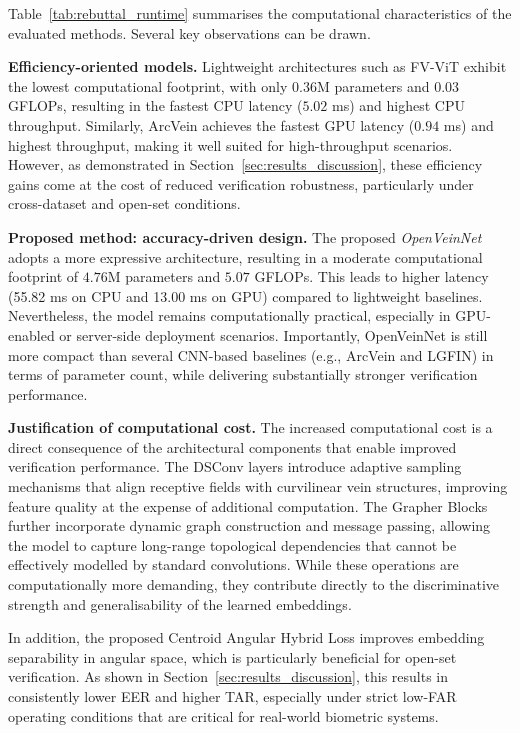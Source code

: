 \documentclass[10pt,journal,compsoc]{IEEEtran}
\begin{document}
Table~\ref{tab:rebuttal_runtime} summarises the computational characteristics of the evaluated methods. Several key observations can be drawn.

\textbf{Efficiency-oriented models.}
Lightweight architectures such as FV-ViT exhibit the lowest computational footprint, with only $0.36$M parameters and $0.03$ GFLOPs, resulting in the fastest CPU latency ($5.02$ ms) and highest CPU throughput. Similarly, ArcVein achieves the fastest GPU latency ($0.94$ ms) and highest throughput, making it well suited for high-throughput scenarios. However, as demonstrated in Section~\ref{sec:results_discussion}, these efficiency gains come at the cost of reduced verification robustness, particularly under cross-dataset and open-set conditions.

\textbf{Proposed method: accuracy-driven design.}
The proposed \textit{OpenVeinNet} adopts a more expressive architecture, resulting in a moderate computational footprint of $4.76$M parameters and $5.07$ GFLOPs. This leads to higher latency (55.82 ms on CPU and 13.00 ms on GPU) compared to lightweight baselines. Nevertheless, the model remains computationally practical, especially in GPU-enabled or server-side deployment scenarios. Importantly, OpenVeinNet is still more compact than several CNN-based baselines (e.g., ArcVein and LGFIN) in terms of parameter count, while delivering substantially stronger verification performance.

\textbf{Justification of computational cost.}
The increased computational cost is a direct consequence of the architectural components that enable improved verification performance. The DSConv layers introduce adaptive sampling mechanisms that align receptive fields with curvilinear vein structures, improving feature quality at the expense of additional computation. The Grapher Blocks further incorporate dynamic graph construction and message passing, allowing the model to capture long-range topological dependencies that cannot be effectively modelled by standard convolutions. While these operations are computationally more demanding, they contribute directly to the discriminative strength and generalisability of the learned embeddings.

In addition, the proposed Centroid Angular Hybrid Loss improves embedding separability in angular space, which is particularly beneficial for open-set verification. As shown in Section~\ref{sec:results_discussion}, this results in consistently lower EER and higher TAR, especially under strict low-FAR operating conditions that are critical for real-world biometric systems.
\end{document}
